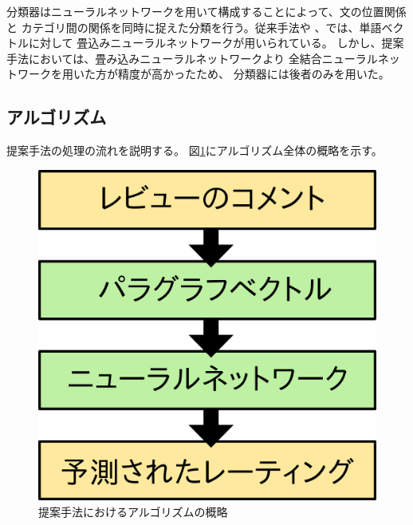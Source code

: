 \documentclass{ttithesis}
\begin{document}
分類器はニューラルネットワークを用いて構成することによって、文の位置関係と
カテゴリ間の関係を同時に捉えた分類を行う。従来手法\cite{nal14}や
\cite{rie14}、\cite{duyu15}では、単語ベクトルに対して
畳込みニューラルネットワークが用いられている。
しかし、提案手法においては、畳み込みニューラルネットワークより
全結合ニューラルネットワークを用いた方が精度が高かったため、
分類器には後者のみを用いた。


\subsection{アルゴリズム}

提案手法の処理の流れを説明する。
図\ref{fig:MyAlgorithm}にアルゴリズム全体の概略を示す。

\begin{figure}
  \includegraphics{fig/algorithm.png}
  \caption{提案手法におけるアルゴリズムの概略}
  \label{fig:MyAlgorithm}
\end{figure}

\end{document}
